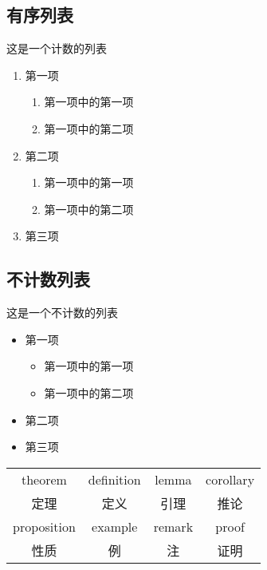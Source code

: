 \subsection{有序列表}
这是一个计数的列表
\begin{enumerate}
  \item 第一项
        \begin{enumerate}
          \item 第一项中的第一项
          \item 第一项中的第二项
        \end{enumerate}
  \item 第二项
        \begin{enumerate}[label=(\roman*)]
          \item 第一项中的第一项
          \item 第一项中的第二项
        \end{enumerate}
  \item 第三项
\end{enumerate}

\subsection{不计数列表}
这是一个不计数的列表
\begin{itemize}
  \item 第一项
        \begin{itemize}
          \item 第一项中的第一项
          \item 第一项中的第二项
        \end{itemize}
  \item 第二项
  \item 第三项
\end{itemize}

\begin{table}[b]
  \label{tab:数学环境}
  \begin{tabularx}{\textwidth}{CCCC}
    \toprule
    theorem     & definition & lemma  & corollary \\
    定理        & 定义       & 引理   & 推论      \\
    \midrule
    proposition & example    & remark & proof     \\
    性质        & 例         & 注     & 证明      \\
    \bottomrule
  \end{tabularx}
\end{table}

